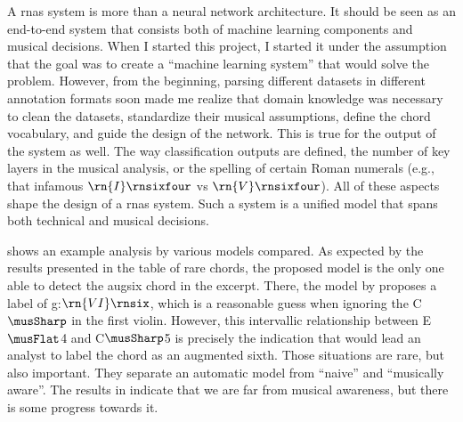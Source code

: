 
A \glspl{rna} system is more than a neural network
architecture. It should be seen as an end-to-end system that
consists both of machine learning components and musical
decisions. When I started this project, I started it under
the assumption that the goal was to create a ``machine
learning system'' that would solve the problem. However,
from the beginning, parsing different datasets in different
annotation formats soon made me realize that domain
knowledge was necessary to clean the datasets, standardize
their musical assumptions, define the chord vocabulary, and
guide the design of the network. This is true for the output
of the system as well. The way classification outputs are
defined, the number of key layers in the musical analysis,
or the spelling of certain Roman numerals (e.g., that
infamous $\rn{I}\rnsixfour$ vs $\rn{V}\rnsixfour$). All of
these aspects shape the design of a \glspl{rna} system. Such
a system is a unified model that spans both technical and
musical decisions.

 shows an example analysis by
various models compared. As expected by the results
presented in the table of rare chords, the proposed model is
the only one able to detect the \gls{augsix} chord in the
excerpt. There, the model by \textcite{mcleod2021modular}
proposes a label of g:$\rn{VI}\rnsix$, which is a reasonable
guess when ignoring the C$\musSharp$ in the first violin.
However, this intervallic relationship between E$\musFlat$4
and C$\musSharp$5 is precisely the indication that would
lead an analyst to label the chord as an augmented sixth.
Those situations are rare, but also important. They separate
an automatic model from ``naive'' and ``musically aware''.
The results in  indicate that we are far
from musical awareness, but there is some progress towards
it.

